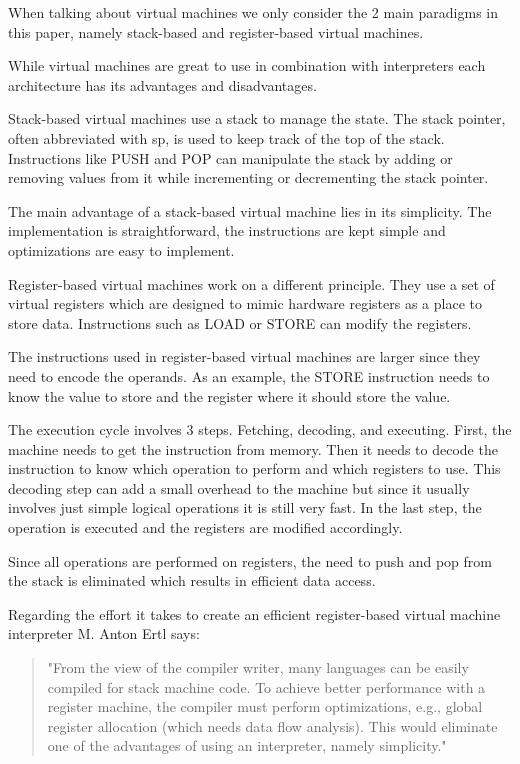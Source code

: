 \documentclass{article}
\begin{document}
When talking about virtual machines we only consider the 2 main paradigms in
this paper, namely stack-based and register-based virtual machines.

While virtual machines are great to use in combination with interpreters
each architecture has its advantages and disadvantages.

Stack-based virtual machines use a stack to manage the state. The stack pointer,
often abbreviated with sp, is used to keep track of the top of the stack.
Instructions like PUSH and POP can manipulate the stack by adding or removing
values from it while incrementing or decrementing the stack pointer.

The main advantage of a stack-based virtual machine lies in its simplicity.
The implementation is straightforward, the instructions are kept simple
and optimizations are easy to implement.

Register-based virtual machines work on a different principle. They use a set of
virtual registers which are designed to mimic hardware registers as a place to
store data. Instructions such as LOAD or STORE can modify the registers.

The instructions used in register-based virtual machines are larger since they
need to encode the operands. As an example, the STORE instruction needs to know 
the value to store and the register where it should store the value.

The execution cycle involves 3 steps. Fetching, decoding, and executing. First,
the machine needs to get the instruction from memory. Then it needs to decode
the instruction to know which operation to perform and which registers to use.
This decoding step can add a small overhead to the machine but since it usually
involves just simple logical operations it is still very fast. In the last step,
the operation is executed and the registers are modified accordingly.

Since all operations are performed on registers, the need to push and pop from
the stack is eliminated which results in efficient data access.

Regarding the effort it takes to create an efficient register-based virtual
machine interpreter M. Anton Ertl says:

\begin{quotation}
"From the view of the compiler writer, many languages can be easily compiled for
stack machine code. To achieve better performance with a register machine, the
compiler must perform optimizations, e.g., global register allocation (which
needs data flow analysis). This would eliminate one of the advantages of using an
interpreter, namely simplicity." ~\cite{stack_caching_for_interpreters}
\end{quotation}
\end{document}
